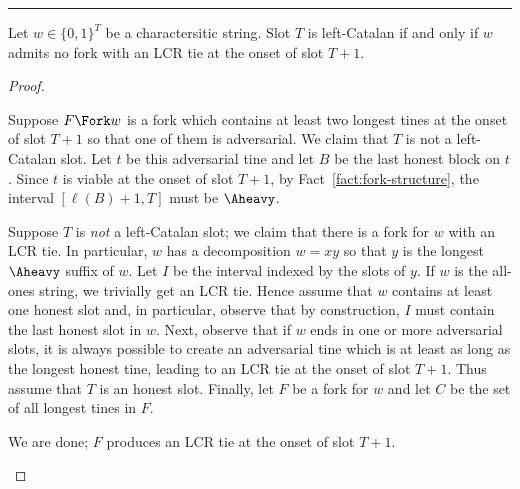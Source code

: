 \hrule



      \begin{theorem}\label{thm:lcr-tie-left-catalan}
        Let $w \in \{0,1\}^T$ be a charactersitic string. 
        Slot $T$ is left-Catalan 
        if and only if 
        $w$ admits no fork with an LCR tie at the onset of slot $T + 1$.
      \end{theorem}
      \begin{proof}
        ~
        \begin{description}[font=\normalfont\itshape\space]
          \item[Forward direction.]
          Suppose $F \Fork w$ is a fork which contains 
          at least two longest tines at the onset of slot $T + 1$ so that 
          one of them is adversarial. 
          We claim that $T$ is not a left-Catalan slot.
          Let $t$ be this adversarial tine and  
          let $B$ be the last honest block on $t$. 
          Since $t$ is viable at the onset of slot $T + 1$, 
          by Fact~\ref{fact:fork-structure}, 
          the interval $[\ell(B) + 1, T]$ must be $\Aheavy$. 



          \item[Reverse direction.]
          Suppose $T$ is \emph{not} a left-Catalan slot; 
          we claim that there is a fork for $w$ with an LCR tie.
          In particular, $w$ has a decomposition $w = xy$ so that 
          $y$ is the longest $\Aheavy$ suffix of $w$. 
          Let $I$ be the interval indexed by the slots of $y$.
          If $w$ is the all-ones string, we trivially get an LCR tie. 
          Hence assume that $w$ contains at least one honest slot and, 
          in particular, 
          observe that by construction, 
          $I$ must contain the last honest slot in $w$. 
          Next, observe that if $w$ ends in one or more adversarial slots, 
          it is always possible to create an adversarial tine which is 
          at least as long as the longest honest tine, 
          leading to an LCR tie at the onset of slot $T + 1$. 
          Thus assume that $T$ is an honest slot.
          Finally, let $F$ be a fork for $w$ 
          and let $C$ be the set of all longest tines in $F$.

          \begin{description}[font=\normalfont\itshape\space]
            \item[If $|C| \geq 2$ and $C$ contains an adversarial tine:]
            We are done; $F$ produces an LCR tie at the onset of slot $T + 1$.


\end{description}
\end{description}
\end{proof}
